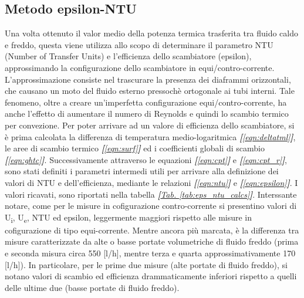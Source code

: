 \documentclass[a4paper,10pt]{article}                                                                                       %
\begin{document}
\subsection{Metodo epsilon-NTU}                                                                                             %
\label{subsec:espntu_meth}                                                                                                  %
  Una volta ottenuto il valor medio della potenza termica trasferita tra fluido caldo e freddo, questa viene utilizza allo
  scopo di determinare il parametro NTU (Number of Transfer Units) e l'efficienza dello scambiatore (epsilon),
  approssimando la configurazione dello scambiatore in equi/contro-corrente. L'approssimazione consiste nel trascurare la
  presenza dei diaframmi orizzontali, che causano un moto del fluido esterno pressochè ortogonale ai tubi interni. Tale
  fenomeno, oltre a creare un'imperfetta configurazione equi/contro-corrente, ha anche l'effetto di aumentare il numero
  di Reynolds e quindi lo scambio termico per convezione. Per poter arrivare ad un valore di efficienza dello scambiatore,
  si è prima calcolata la differenza di temperatura medio-logaritmica \textit{\textbf{[}\ref{eqn:deltatml}\textbf{]}}, le
  aree di scambio termico \textit{\textbf{[}\ref{eqn:surf}\textbf{]}} ed i coefficienti globali di scambio
  \textit{\textbf{[}\ref{eqn:ghtc}\textbf{]}}. Successivamente attraverso le equazioni
  \textit{\textbf{[}\ref{eqn:cpt}\textbf{]}} e \textit{\textbf{[}\ref{eqn:cpt_r}\textbf{]}}, sono stati definiti i
  parametri intermedi utili per arrivare alla definizione dei valori di NTU e dell'efficienza, mediante le relazioni
  \textit{\textbf{[}\ref{eqn:ntu}\textbf{]}} e \textit{\textbf{[}\ref{eqn:epsilon}\textbf{]}}. I valori ricavati, sono
  riportati nella tabella \textit{\textbf{[}\hyperref[tab:eps_ntu_calcs]{Tab. }\ref{tab:eps_ntu_calcs}\textbf{]}}.
  Interssante notare, come per le misure in cofigurazione contro-corrente si presentino valori di U\textsubscript{i},
  U\textsubscript{e}, NTU ed epsilon, leggermente maggiori rispetto alle misure in cofigurazione di tipo equi-corrente.
  Mentre ancora più marcata, è la differenza tra misure caratterizzate da alte o basse portate volumetriche di fluido
  freddo (prima e seconda misura circa 550 [l/h], mentre terza e quarta approssimativamente 170 [l/h]). In particolare, per
  le prime due misure (alte portate di fluido freddo), si notano valori di scambio ed efficienza drammaticamente inferiori
  rispetto a quelli delle ultime due (basse portate di fluido freddo).
\end{document}
